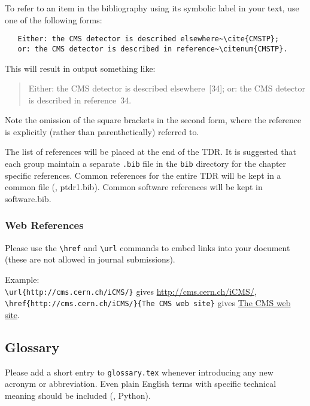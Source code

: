 To refer to an item in the bibliography using its symbolic label
in your text, use one of the following forms:
\vspace*{-2.5ex}\begin{verbatim}
   Either: the CMS detector is described elsewhere~\cite{CMSTP};
   or: the CMS detector is described in reference~\citenum{CMSTP}.
\end{verbatim}

This will result in output something like:
\begin{quote}
   Either: the CMS detector is described elsewhere~[34];
   or: the CMS detector is described in reference~34.
\end{quote}
%
Note the omission of the square brackets in the second form,
where the reference is explicitly (rather than parenthetically)
referred to.

The list of references will be placed at the end of the TDR. It is
suggested that each group maintain a separate \texttt{.bib} file in the
\texttt{bib} directory for the chapter specific references. Common
references for the entire TDR will be kept in a common file (\eg, ptdr1.bib). Common software references will be kept in
software.bib.

\subsubsection{Web References}
Please use the \verb+\href+ and \verb+\url+ commands to embed links into your document (these are not allowed in journal submissions).

Example:\\
\verb+\url{http://cms.cern.ch/iCMS/}+ gives \url{http://cms.cern.ch/iCMS/},\\
\verb+\href{http://cms.cern.ch/iCMS/}{The CMS web site}+ gives \href{http://cms.cern.ch/iCMS/}{The CMS web site}.


\subsection{Glossary}

Please add a short entry to \texttt{glossary.tex}
whenever introducing any new acronym or abbreviation.
Even plain English terms with specific technical
meaning should be included (\eg, Python).
\setlength{\columnseprule}{0.2mm}
\setlength{\multicolsep}{7mm}
\providecommand{\symexamp}[2]
{
\makebox[0.160\textwidth][l]{#1:}
                          \makebox[0.025\textwidth][l]{~}
                          \parbox[t]{0.32\textwidth}{#2\vspace*{-2.5mm}\\}}

